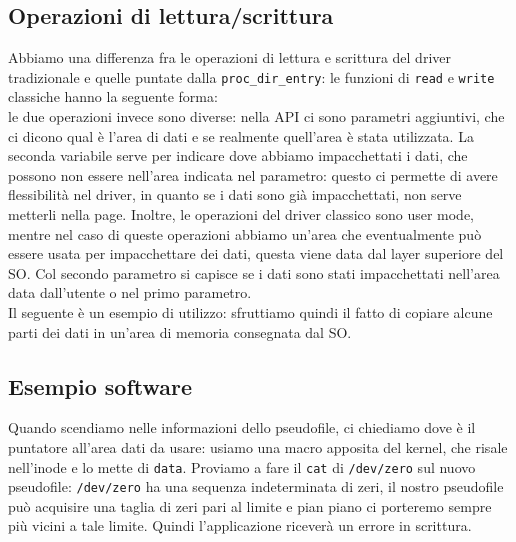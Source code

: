 \documentclass[12pt, oneside]{extbook}
\begin{document}
\subsection{Operazioni di lettura/scrittura}
Abbiamo una differenza fra le operazioni di lettura e scrittura del driver tradizionale e quelle puntate dalla \texttt{proc\_dir\_entry}: le funzioni di \texttt{read} e \texttt{write} classiche hanno la seguente forma:\\
le due operazioni invece sono diverse:
nella API ci sono parametri aggiuntivi, che ci dicono qual è l'area di dati e se realmente quell'area è stata utilizzata. La seconda variabile serve per indicare dove abbiamo impacchettati i dati, che possono non essere nell'area indicata nel parametro: questo ci permette di avere flessibilità nel driver, in quanto se i dati sono già impacchettati, non serve metterli nella page. Inoltre, le operazioni del driver classico sono user mode, mentre nel caso di queste operazioni abbiamo un'area che eventualmente può essere usata per impacchettare dei dati, questa viene data dal layer superiore del SO. Col secondo parametro si capisce se i dati sono stati impacchettati nell'area data dall'utente o nel primo parametro.\\Il seguente è un esempio di utilizzo:
sfruttiamo quindi il fatto di copiare alcune parti dei dati in un'area di memoria consegnata dal SO.
\subsection*{Esempio software}
Quando scendiamo nelle informazioni dello pseudofile, ci chiediamo dove è il puntatore all'area dati da usare: usiamo una macro apposita del kernel, che risale nell'inode e lo mette di \texttt{data}. Proviamo a fare il \texttt{cat} di \texttt{/dev/zero} sul nuovo pseudofile: \texttt{/dev/zero} ha una sequenza indeterminata di zeri, il nostro pseudofile può acquisire una taglia di zeri pari al limite e pian piano ci porteremo sempre più vicini a tale limite. Quindi l'applicazione riceverà un errore in scrittura.
\end{document}

